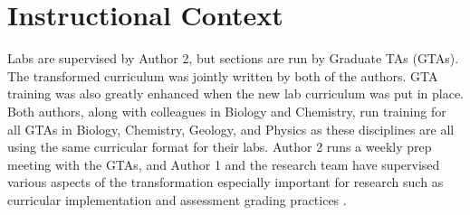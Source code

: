 \documentclass[aip, numerical, preprint]{revtex4-2}
\begin{document}
\section{Instructional Context}


Labs are supervised by Author 2, but sections are run by Graduate TAs (GTAs). The
transformed curriculum was jointly written by both of the authors.  GTA training was also greatly
enhanced when the new lab curriculum was put in place.  Both authors, along with colleagues in
Biology and Chemistry, run training for all GTAs in Biology, Chemistry, Geology, and Physics
as these disciplines are all using the same curricular format for their labs.  Author 2 runs a
weekly prep meeting with the GTAs, and Author 1 and the research team have supervised various
aspects of the transformation especially important for research such as curricular
implementation \citep{SmithJoyner2020} and assessment grading practices \citep{Wolf2019mask}.
\end{document}
